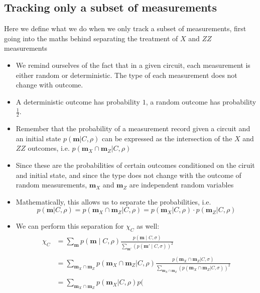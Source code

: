 \subsection{Tracking only a subset of measurements}
\label{sec:lxe-indep}
Here we define what we do when we only track a subset of measurements, first
going into the maths behind separating the treatment of $X$ and $ZZ$
measurements
\begin{itemize}
  \item We remind ourselves of the fact that in a given circuit, each
    measurement is either random or deterministic. The type of each measurement
    does not change with outcome.
  \item A deterministic outcome has probability $1$, a random outcome has
    probability $\frac{1}{2}$.
  \item Remember that the probability of a measurement record given a circuit
    and an initial state $p(\mathbf{m} | C, \rho)$ can be expressed as the
    intersection of the $X$ and $ZZ$ outcomes, i.e. $p(\mathbf{m}_X \cap
    \mathbf{m}_Z | C, \rho)$
  \item Since these are the probabilities of certain outcomes conditioned on
    the ciruit and initial state, and since the type does not change with the outcome
    of random measurements, $\mathbf{m}_X$ and $\mathbf{m}_Z$ are independent random
    variables
  \item Mathematically, this allows us to separate the probabilities, i.e. \[
      p(\mathbf{m} | C, \rho) = p(\mathbf{m}_X \cap \mathbf{m}_Z | C, \rho) =
    p(\mathbf{m}_X | C, \rho)\cdot p(\mathbf{m}_Z | C, \rho) \]
  \item We can perform this separation for $\chi_C$ as well:
    \begin{align}
      \label{eq:lxe-subset}
    \begin{split}
      \chi_C &= \sum_{\mathbf{m}} p(\mathbf{m} \mid C, \rho) \frac{p(\mathbf{m} \mid
      C, \sigma)}{\sum_{\mathbf{m}'}\left(p(\mathbf{m}' \mid
      C, \sigma)\right)^2} \\
      \\
      &= \sum_{\mathbf{m}_X \cap \mathbf{m}_Z} p(\mathbf{m}_X \cap \mathbf{m}_Z |
        C, \rho) \frac{p(\mathbf{m}_X \cap \mathbf{m}_Z| C,
        \sigma)}{\sum_{\mathbf{m}_X \cap \mathbf{m}_Z} \left(p(\mathbf{m}_X \cap
        \mathbf{m}_Z|C,\sigma)\right)^2}\\
        \\
      &= \sum_{\mathbf{m}_X \cap \mathbf{m}_Z} p(\mathbf{m}_X | C, \rho) p(

\end{split}
\end{align}
\end{itemize}
